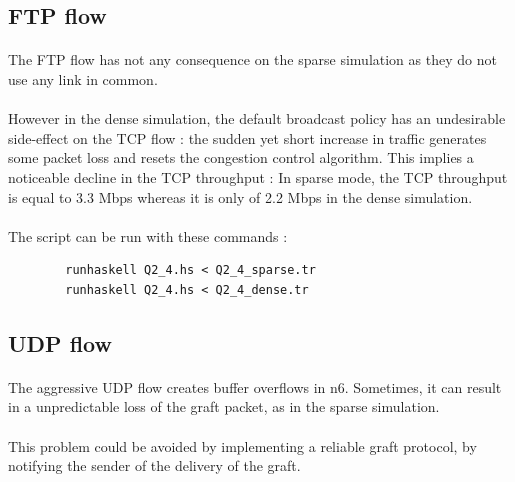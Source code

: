 \documentclass[a4paper]{article}
\begin{document}
  \subsection{FTP flow}

    \paragraph{}The FTP flow has not any consequence on the sparse simulation as
they do not use any link in common.

    \paragraph{}However in the dense simulation, the default broadcast policy
has an undesirable side-effect on the TCP flow : the sudden yet short increase
in traffic generates some packet loss and resets the congestion control
algorithm. This implies a noticeable decline in the TCP throughput :
\newline In sparse mode, the TCP throughput is equal to 3.3 Mbps whereas it is
only of 2.2 Mbps in the dense simulation.

    \paragraph{}The script can be run with these commands :
    \begin{verbatim}
        runhaskell Q2_4.hs < Q2_4_sparse.tr
        runhaskell Q2_4.hs < Q2_4_dense.tr
    \end{verbatim}

  \subsection{UDP flow}

    \paragraph{}The aggressive UDP flow creates buffer overflows in n6.
Sometimes, it can result in a unpredictable loss of the graft packet, as in
the sparse simulation.

    \paragraph{}This problem could be avoided by implementing a reliable
graft protocol, by notifying the sender of the delivery of the graft.
\end{document}
